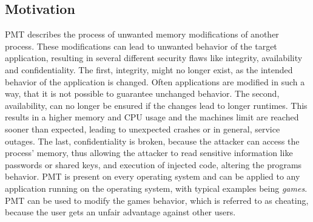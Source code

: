 \subsection{Motivation}
\gls{PMT} describes the process of unwanted memory modifications of another process. These modifications can lead to unwanted behavior of the target application, resulting in several different security flaws like integrity, availability and confidentiality. The first, integrity, might no longer exist, as the intended behavior of the application is changed. Often applications are modified in such a way, that it is not possible to guarantee unchanged behavior. The second, availability, can no longer be ensured if the changes lead to longer runtimes. This results in a higher memory and CPU usage and the machines limit are reached sooner than expected, leading to unexpected crashes or in general, service outages. The last, confidentiality is broken, because the attacker can access the process' memory, thus allowing the attacker to read sensitive information like passwords or shared keys, and execution of injected code, altering the programs behavior. \gls{PMT} is present on every operating system and can be applied to any application running on the operating system, with typical examples being \emph{games}. \gls{PMT} can be used to modify the games behavior, which is referred to as cheating, because the user gets an unfair advantage against other users.